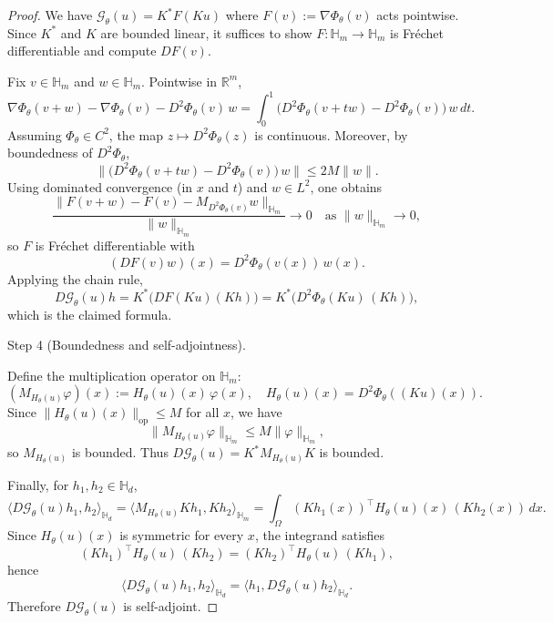 \documentclass[10pt,a4paper]{amsart}
\newcommand{\Hd}{\mathbb{H}_d}
\newcommand{\Hm}{\mathbb{H}_m}
\newcommand{\inner}[2]{\langle #1, #2 \rangle}
\newcommand{\op}{\mathrm{op}}
\begin{document}
\begin{proof}
We have $\mathcal{G}_\theta(u)=K^*F(Ku)$ where $F(v):=\nabla\Phi_\theta(v)$ acts pointwise.
Since $K^*$ and $K$ are bounded linear, it suffices to show $F:\Hm\to\Hm$ is Fr\'echet differentiable and compute $DF(v)$.

Fix $v\in\Hm$ and $w\in\Hm$. Pointwise in $\mathbb{R}^m$,
\[
\nabla\Phi_\theta(v+w)-\nabla\Phi_\theta(v) - D^2\Phi_\theta(v)\,w
= \int_0^1 \big(D^2\Phi_\theta(v+t w)-D^2\Phi_\theta(v)\big)\,w\,dt.
\]
Assuming $\Phi_\theta\in C^2$, the map $z\mapsto D^2\Phi_\theta(z)$ is continuous.
Moreover, by boundedness of $D^2\Phi_\theta$,
\[
\|\big(D^2\Phi_\theta(v+t w)-D^2\Phi_\theta(v)\big)\,w\|
\le 2M\|w\|.
\]
Using dominated convergence (in $x$ and $t$) and $w\in L^2$, one obtains
\[
\frac{\|F(v+w)-F(v)-M_{D^2\Phi_\theta(v)}w\|_{\Hm}}{\|w\|_{\Hm}}\to 0
\quad\text{as }\|w\|_{\Hm}\to 0,
\]
so $F$ is Fr\'echet differentiable with
\[
(DF(v)w)(x)=D^2\Phi_\theta(v(x))\,w(x).
\]
Applying the chain rule,
\[
D\mathcal{G}_\theta(u)h
=K^*\big(DF(Ku)(Kh)\big)
=K^*\big(D^2\Phi_\theta(Ku)\,(Kh)\big),
\]
which is the claimed formula.

Step 4 (Boundedness and self-adjointness).

Define the multiplication operator on $\Hm$:
\[
(M_{H_\theta(u)}\varphi)(x):=H_\theta(u)(x)\,\varphi(x),
\quad H_\theta(u)(x)=D^2\Phi_\theta((Ku)(x)).
\]
Since $\|H_\theta(u)(x)\|_{\op}\le M$ for all $x$, we have
\[
\|M_{H_\theta(u)}\varphi\|_{\Hm}\le M\|\varphi\|_{\Hm},
\]
so $M_{H_\theta(u)}$ is bounded.
Thus $D\mathcal{G}_\theta(u)=K^*M_{H_\theta(u)}K$ is bounded.

Finally, for $h_1,h_2\in\Hd$,
\[
\inner{D\mathcal{G}_\theta(u)h_1}{h_2}_{\Hd}
=\inner{M_{H_\theta(u)}Kh_1}{Kh_2}_{\Hm}
=\int_\Omega (Kh_1(x))^\top H_\theta(u)(x)\,(Kh_2(x))\,dx.
\]
Since $H_\theta(u)(x)$ is symmetric for every $x$, the integrand satisfies
\[
(Kh_1)^\top H_\theta(u)\,(Kh_2)=(Kh_2)^\top H_\theta(u)\,(Kh_1),
\]
hence
\[
\inner{D\mathcal{G}_\theta(u)h_1}{h_2}_{\Hd}
=\inner{h_1}{D\mathcal{G}_\theta(u)h_2}_{\Hd}.
\]
Therefore $D\mathcal{G}_\theta(u)$ is self-adjoint.
\end{proof}
\end{document}
